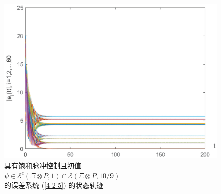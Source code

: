 \begin{figure}[H]
    \begin{center}
        \begin{minipage}[c]{0.5\textwidth}
            \centering
            \includegraphics[scale=0.5]{./ch4/fig4-6.eps}
            \centering
            \caption{具有饱和脉冲控制且初值\\ $\psi\in\mathcal{E}^c(\varXi\otimes P,1) \cap \mathcal{E}(\varXi\otimes P, 10/9)$ \\的误差系统 (\ref{4-2-5}) 的状态轨迹}
            \label{f4-6}
        \end{minipage}%

\end{center}
\end{figure}
